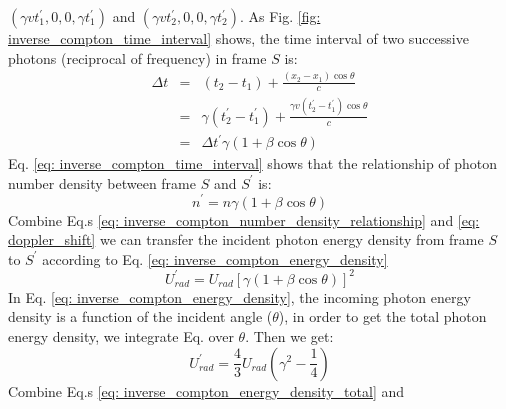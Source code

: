\documentclass[12pt]{report}
\begin{document}
              $\left(\gamma v t_{1}^{\prime}, 0, 0, \gamma t_{1}^{\prime}\right)$ and 
              $\left(\gamma v t_{2}^{\prime}, 0, 0, \gamma t_{2}^{\prime}\right)$. 
            As Fig. \ref{fig: inverse_compton_time_interval} shows, the time interval of two successive 
            photons (reciprocal of frequency) in frame $S$ is: 
            \begin{eqnarray}
              \label{eq: inverse_compton_time_interval}
              \Delta t &=& \left(t_2 - t_1\right) + \frac{\left(x_2 - x_1\right) \cos{\theta}}{c}  \nonumber \\
                      &=& \gamma \left(t_{2}^{\prime} - t_{1}^{\prime}\right) + \frac{\gamma v \left(t_{2}^{\prime} - t_{1}^{\prime}\right) \cos{\theta}}{c} \nonumber \\
                      &=&  \Delta t^{\prime} \gamma \left(1 + \beta \cos{\theta}\right) 
            \end{eqnarray}
            Eq. \ref{eq: inverse_compton_time_interval} shows that the relationship of photon number 
            density between frame $S$ and $S^{\prime}$ is:
            \begin{equation}
              \label{eq: inverse_compton_number_density_relationship}
              n^{\prime} = n \gamma \left(1 + \beta \cos{\theta}\right) 
            \end{equation}
            Combine Eq.s \ref{eq: inverse_compton_number_density_relationship} and 
            \ref{eq: doppler_shift} we can transfer the incident photon energy density from frame $S$ to 
            $S^{\prime}$ according to Eq. \ref{eq: inverse_compton_energy_density}
            \begin{equation}
              \label{eq: inverse_compton_energy_density}
              U_{rad}^{\prime} = U_{rad} \left[\gamma \left(1 + \beta \cos{\theta}\right)\right]^{2}
            \end{equation}
            In Eq. \ref{eq: inverse_compton_energy_density}, the incoming photon energy density 
            is a function of the incident angle ($\theta$), in order to get the total photon energy density,
            we integrate Eq. over $\theta$. Then we get: 
            \begin{equation}
              \label{eq: inverse_compton_energy_density_total}
              U_{rad}^{\prime} = \frac{4}{3} U_{rad} \left(\gamma^2 - \frac{1}{4}\right)
            \end{equation}
            Combine Eq.s \ref{eq: inverse_compton_energy_density_total} and 
\end{document}
